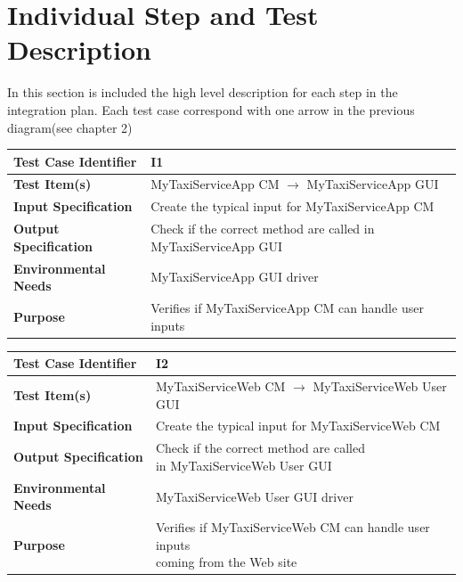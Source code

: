 \documentclass[11pt,titlepage]{article} %
\begin{document}
\newpage
\section{Individual Step and Test Description}
  In this section is included the high level description for each step in the integration plan.
  Each test case correspond with one arrow in the previous diagram(see chapter 2)
  
  \begin{table}[ht!]
    \begin{tabular*}{16cm}{ll}
	\hline
	\textbf{Test Case Identifier} & I1\\
	\hline
	\textbf{Test Item(s)} & MyTaxiServiceApp CM $ \longrightarrow $ MyTaxiServiceApp GUI \\
	\hline
	\textbf{Input Specification} & Create the typical input for MyTaxiServiceApp CM\\
	\hline
	\textbf{Output Specification} & Check if the correct method are called in MyTaxiServiceApp GUI\\
	\hline
	\textbf{Environmental Needs} & MyTaxiServiceApp GUI driver\\
	\hline
	\textbf{Purpose} & Verifies if MyTaxiServiceApp CM can handle user inputs \\
	\hline
    \end{tabular*}
  \end{table}
  
  \begin{table}[ht!]
    \begin{tabular*}{16cm}{ll}
	\hline
	\textbf{Test Case Identifier} & I2\\
	\hline
	\textbf{Test Item(s)} & MyTaxiServiceWeb CM $ \longrightarrow $ MyTaxiServiceWeb User GUI \\
	\hline
	\textbf{Input Specification} & Create the typical input for MyTaxiServiceWeb CM\\
	\hline
	\textbf{Output Specification} & \pbox{20cm}{Check if the correct method are called \\ in MyTaxiServiceWeb User GUI} \\
	\hline
	\textbf{Environmental Needs} & MyTaxiServiceWeb User GUI driver\\
	\hline
	\textbf{Purpose} & \pbox{20cm}{Verifies if MyTaxiServiceWeb CM can handle user inputs \\ coming from the Web site} \\
	\hline
    \end{tabular*}
  \end{table}
  
\end{document}
